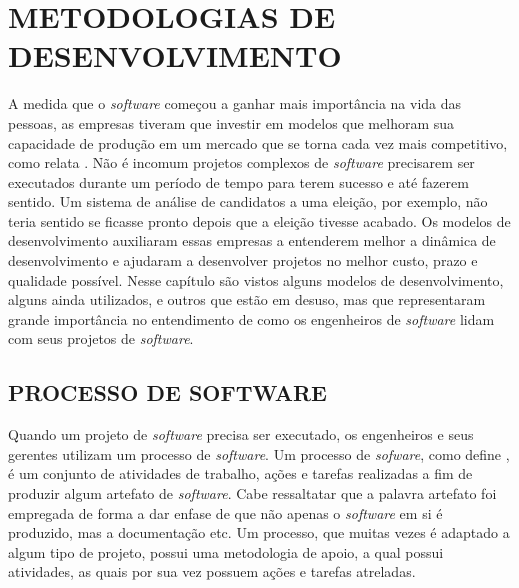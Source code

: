 \chapter{METODOLOGIAS DE DESENVOLVIMENTO}
\label{cap:02}

A medida que o \textit{software} começou a ganhar mais importância na vida das pessoas, as empresas tiveram que investir em modelos que melhoram sua capacidade de produção em um mercado que se torna cada vez mais competitivo, como relata . Não é incomum projetos complexos de \textit{software} precisarem ser executados durante um período de tempo para terem sucesso e até fazerem sentido. Um sistema de análise de candidatos a uma eleição, por exemplo, não teria sentido se ficasse pronto depois que a eleição tivesse acabado. Os modelos de desenvolvimento auxiliaram essas empresas a entenderem melhor a dinâmica de desenvolvimento e ajudaram a desenvolver projetos no melhor custo, prazo e qualidade possível. Nesse capítulo são vistos alguns modelos de desenvolvimento, alguns ainda utilizados, e outros que estão em desuso, mas que representaram grande importância no entendimento de como os engenheiros de \textit{software} lidam com seus projetos de \textit{software}. 

\section{PROCESSO DE SOFTWARE}

Quando um projeto de \textit{software} precisa ser executado, os engenheiros e seus gerentes utilizam um processo de \textit{software}. Um processo de \textit{sofware}, como define , é um conjunto de atividades de trabalho, ações e tarefas realizadas a fim de produzir algum artefato de \textit{software}. Cabe ressaltatar que a palavra artefato foi empregada de forma a dar enfase de que não apenas o \textit{software} em si é produzido, mas a documentação etc. Um processo, que muitas vezes é adaptado a algum tipo de projeto, possui uma metodologia de apoio, a qual possui atividades, as quais por sua vez possuem ações e tarefas atreladas.


